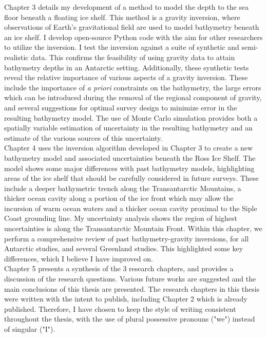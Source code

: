 Chapter 3 details my development of a method to model the depth to the sea floor beneath a floating ice shelf. This method is a gravity inversion, where observations of Earth's gravitational field are used to model bathymetry beneath an ice shelf. I develop open-source Python code with the aim for other researchers to utilize the inversion. I test the inversion against a suite of synthetic and semi-realistic data. This confirms the feasibility of using gravity data to attain bathymetry depths in an Antarctic setting. Additionally, these synthetic tests reveal the relative importance of various aspects of a gravity inversion. These include the importance of \textit{a priori} constraints on the bathymetry, the large errors which can be introduced during the removal of the regional component of gravity, and several suggestions for optimal survey design to minimize error in the resulting bathymetry model. The use of Monte Carlo simulation provides both a spatially variable estimation of uncertainty in the resulting bathymetry and an estimate of the various sources of this uncertainty. \\

Chapter 4 uses the inversion algorithm developed in Chapter 3 to create a new bathymetry model and associated uncertainties beneath the Ross Ice Shelf. The model shows some major differences with past bathymetry models, highlighting areas of the ice shelf that should be carefully considered in future surveys. These include a deeper bathymetric trench along the Transantarctic Mountains, a thicker ocean cavity along a portion of the ice front which may allow the incursion of warm ocean waters and a thicker ocean cavity proximal to the Siple Coast grounding line. My uncertainty analysis shows the region of highest uncertainties is along the Transantarctic Mountain Front. Within this chapter, we perform a comprehensive review of past bathymetry-gravity inversions, for all Antarctic studies, and several Greenland studies. This highlighted some key differences, which I believe I have improved on. \\

Chapter 5 presents a synthesis of the 3 research chapters, and provides a discussion of the research questions. Various future works are suggested and the main conclusions of this thesis are presented. The research chapters in this thesis were written with the intent to publish, including Chapter 2 which is already published. Therefore, I have chosen to keep the style of writing consistent throughout the thesis, with the use of plural possessive pronouns ("we") instead of singular ("I"). 

